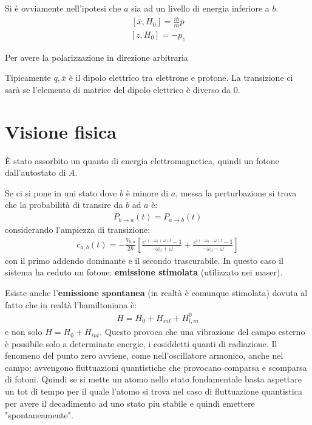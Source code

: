 Si è ovviamente nell'ipotesi che $a$ sia ad un livello di energia inferiore a $b$.
\begin{equation}\begin{split}
\left[\bar x,H_0\right]=\frac{i\hbar }{m}\bar p
\end{split}\end{equation}
\begin{equation}\begin{split}
\left[z,H_0\right]=-p_z
\end{split}\end{equation}

Per avere la polarizzazione in direzione arbitraria


Tipicamente $q,\bar x$ è il dipolo elettrico tra elettrone e protone. La transizione ci sarà se l'elemento di matrice del dipolo elettrico è diverso da $0$.

\section{Visione fisica} %
È stato assorbito un quanto di energia elettromagnetica, quindi un fotone dall'autostato di $A$.

Se ci si pone in uni stato dove $b$ è minore di $a$, messa la perturbazione si trova che la probabilità di transire da $b$ ad $a$ è:
\begin{equation}\begin{split}
P_{b\to a} \left(t\right)= P_{a\to b}\left(t\right)
\end{split}\end{equation}
considerando l'ampiezza di transizione:
\begin{equation}\begin{split}
c_{a,b}\left(t\right)=-\frac{V_{b,a}}{2\hbar }\left[\frac{e^{i\left(-\omega _0+\omega \right)t}-1}{-\omega _0+\omega }+\frac{e^{i\left(-\omega _0-\omega \right)t}-1}{-\omega _0-\omega }\right]
\end{split}\end{equation}
con il primo addendo dominante e il secondo trascurabile. In questo caso il sistema ha ceduto un fotone: \textbf{emissione stimolata} (utilizzato nei maser).

Esiste anche l'\textbf{emissione spontanea} (in realtà è comunque stimolata) dovuta al fatto che in realtà l'hamiltoniana è:
\begin{equation}\begin{split}
H=H_0+H_{int}+H_{l,m}^0
\end{split}\end{equation}
e non solo $H=H_0+H_{int}$. Questo provoca che una vibrazione del campo esterno è possibile solo a determinate energie, i cosiddetti quanti di radiazione. Il fenomeno del punto zero avviene, come nell'oscillatore armonico, anche nel campo: avvengono fluttuazioni quantistiche che provocano comparsa e scomparsa di fotoni. Quindi se si mette un atomo nello stato fondamentale basta aspettare un tot di tempo per il quale l'atomo si trova nel caso di fluttuazione quantistica per avere il decadimento ad uno stato piu stabile e quindi emettere "spontaneamente".


